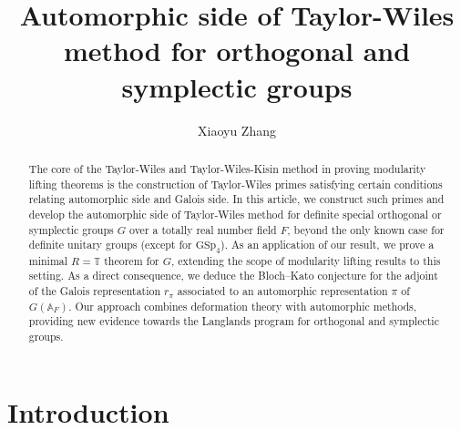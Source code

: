 \documentclass[12pt,oneside,reqno]{amsart}
\date{}
\newcommand{\T}{\mathbb{T}}
\theoremstyle{plain}
\begin{document}
	\title{Automorphic side of Taylor-Wiles method for orthogonal and symplectic groups}
	\author{Xiaoyu Zhang}
	\address{Universität Duisburg-Essen, Fakultät für Mathematik, Mathematikcarrée, Thea-Leymann-Straße 9, 45127 Essen, Germany}
	\maketitle
	
	
	
	
	
	\begin{abstract}		
		The core of the Taylor-Wiles and Taylor-Wiles-Kisin method in proving modularity lifting theorems is the construction of Taylor-Wiles primes satisfying certain conditions relating automorphic side and Galois side. In this article, we construct such primes and develop the automorphic side of Taylor-Wiles method for definite special orthogonal or symplectic groups $G$ over a totally real number field $F$, beyond the only known case for definite unitary groups (except for $\mathrm{GSp}_4$).
		As an application of our result, we prove a minimal $R=\T$ theorem for \( G \), extending the scope of modularity lifting results to this setting. As a direct consequence, we deduce the Bloch--Kato conjecture for the adjoint of the Galois representation \( r_\pi \) associated to an automorphic representation \( \pi \) of \( G(\mathbb{A}_F) \). Our approach combines deformation theory with automorphic methods, providing new evidence towards the Langlands program for orthogonal and symplectic groups.
	\end{abstract}
	
	
	
	
	
	
	
	
	\tableofcontents
	
	
	
	
	
	
	
	
	
	
	
	\section{Introduction}
	
\end{document}
